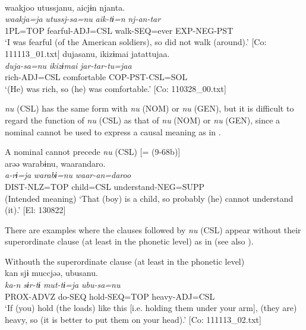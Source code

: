 \begin{xlist}
\ea\label{ex:10.37} 
  \ea\relax [= (9-44 c)]\\
      \glll    waakjoo  utussjanu,  aicjɨn  njanta.\\
      \textit{waakja=ja}  \textit{utussj-sa=nu}  \textit{aik-tɨ=n}  \textit{nj-an-tar}\\
      1PL=TOP  fearful-ADJ=CSL  walk-SEQ=ever  EXP-NEG-PST\\
      \glt       ‘I was fearful (of the American soldiers), so did not walk (around).’ [Co: 111113\_01.txt]
  \ex   %
      \glll    dujasanu,  ikizɨmai  jatattujaa.\\
      \textit{duja-sa=nu}  \textit{ikizɨmai}  \textit{jar-tar-tu=jaa}\\
      rich-ADJ=CSL  comfortable  COP-PST-CSL=SOL\\
      \glt       ‘(He) was rich, so (he) was comfortable.’ [Co: 110328\_00.txt]
    \z
\z

  \textit{nu} (CSL) has the same form with \textit{nu} (NOM) or \textit{nu} (GEN), but it is difficult to regard the function of \textit{nu} (CSL) as that of \textit{nu} (NOM) or \textit{nu} (GEN), since a nominal cannot be used to express a causal meaning as in .

\ea\label{ex:10.38}   A nominal cannot precede \textit{nu} (CSL) [= (9-68b)]\\
      \glll    *arəə  warabɨnu,  waarandaro.\\
     \textit{a-rɨ=ja}  \textit{warabɨ=nu}  \textit{waar-an=daroo}\\
     DIST-NLZ=TOP  child=CSL  understand-NEG=SUPP\\
    \glt     (Intended meaning) ‘That (boy) is a child, so probably (he) cannot understand (it).’ [El: 130822]
\z

  There are examples where the clauses followed by \textit{nu} (CSL) appear without their superordinate clause (at least in the phonetic level) as in  (see also ).

\ea\label{ex:10.39}   Withouth the superordinate clause (at least in the phonetic level)\\%
      \glll    kan  sjɨ  muccjəə,  ubusanu.\\
    \textit{ka-n}  \textit{sɨr-tɨ}  \textit{mut-tɨ=ja}  \textit{ubu-sa=nu}\\
    PROX-ADVZ  do-SEQ  hold-SEQ=TOP  heavy-ADJ=CSL\\
\glt     ‘If (you) hold (the loads) like this [i.e. holding them under your arm], (they are) heavy, so (it is better to put them on your head).’  [Co: 111113\_02.txt]
\z


\end{xlist}
